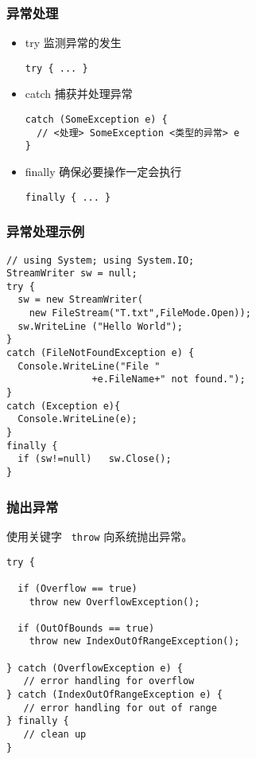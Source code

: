 \begin{frame}[fragile]
\frametitle{异常处理}
\begin{itemize}
\item try 监测异常的发生
\begin{lstlisting}
try { ... }
\end{lstlisting}
  \pause
\item catch 捕获并处理异常
\begin{lstlisting}[escapeinside=<>]
catch (SomeException e) {
  // <处理> SomeException <类型的异常> e
}

\end{lstlisting}
  \pause
\item finally 确保必要操作一定会执行
\begin{lstlisting}
finally { ... }
\end{lstlisting}
\end{itemize}
\end{frame}


\begin{frame}[fragile]
\frametitle{异常处理示例}
\begin{lstlisting}
// using System; using System.IO;
StreamWriter sw = null;
try {
  sw = new StreamWriter(
    new FileStream("T.txt",FileMode.Open));
  sw.WriteLine ("Hello World");
}
catch (FileNotFoundException e) {
  Console.WriteLine("File "
               +e.FileName+" not found.");
}
catch (Exception e){
  Console.WriteLine(e);
}
finally {
  if (sw!=null)   sw.Close();
}

\end{lstlisting}
\end{frame}

\begin{frame}[fragile]
\frametitle{抛出异常}
使用关键字 ~\texttt{throw} 向系统抛出异常。
\begin{lstlisting}
try {

  if (Overflow == true)
    throw new OverflowException();

  if (OutOfBounds == true)
    throw new IndexOutOfRangeException();

} catch (OverflowException e) {
   // error handling for overflow
} catch (IndexOutOfRangeException e) {
   // error handling for out of range
} finally {
   // clean up
}
\end{lstlisting}
\end{frame}

